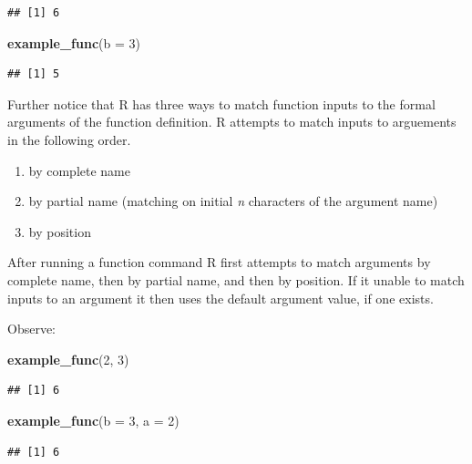 \documentclass[
]{book}
\newenvironment{Shaded}{\begin{snugshade}}{\end{snugshade}}
\newcommand{\DataTypeTok}[1]{\textcolor[rgb]{0.13,0.29,0.53}{#1}}
\newcommand{\DecValTok}[1]{\textcolor[rgb]{0.00,0.00,0.81}{#1}}
\newcommand{\KeywordTok}[1]{\textcolor[rgb]{0.13,0.29,0.53}{\textbf{#1}}}
\newcommand{\NormalTok}[1]{#1}
\begin{document}
\begin{verbatim}
## [1] 6
\end{verbatim}

\begin{Shaded}
\begin{Highlighting}[]
\KeywordTok{example_func}\NormalTok{(}\DataTypeTok{b =} \DecValTok{3}\NormalTok{)}
\end{Highlighting}
\end{Shaded}

\begin{verbatim}
## [1] 5
\end{verbatim}

Further notice that R has three ways to match function inputs to the formal arguments of the function definition. R attempts to match inputs to arguements in the following order.

\begin{enumerate}
\def\labelenumi{\arabic{enumi})}
\item
  by complete name
\item
  by partial name (matching on initial \emph{n} characters of the argument name)
\item
  by position
\end{enumerate}

After running a function command R first attempts to match arguments by complete name, then by partial name, and then by position. If it unable to match inputs to an argument it then uses the default argument value, if one exists.

Observe:

\begin{Shaded}
\begin{Highlighting}[]
\KeywordTok{example_func}\NormalTok{(}\DecValTok{2}\NormalTok{, }\DecValTok{3}\NormalTok{)}
\end{Highlighting}
\end{Shaded}

\begin{verbatim}
## [1] 6
\end{verbatim}

\begin{Shaded}
\begin{Highlighting}[]
\KeywordTok{example_func}\NormalTok{(}\DataTypeTok{b =} \DecValTok{3}\NormalTok{, }\DataTypeTok{a =} \DecValTok{2}\NormalTok{)}
\end{Highlighting}
\end{Shaded}

\begin{verbatim}
## [1] 6
\end{verbatim}
\end{document}

